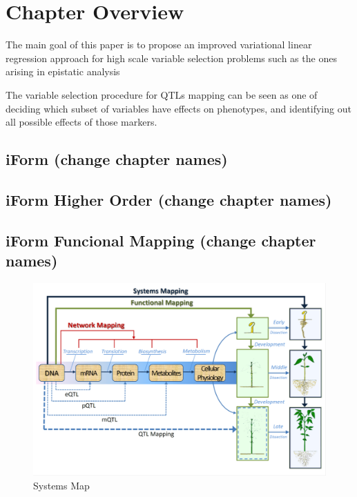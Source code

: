 \documentclass[11pt,]{book}
\theoremstyle{definition}
\theoremstyle{definition}
\theoremstyle{remark}
\begin{document}
\section{Chapter Overview}\label{chapter-overview}

The main goal of this paper is to propose an improved variational linear
regression approach for high scale variable selection problems such as
the ones arising in epistatic analysis

The variable selection procedure for QTLs mapping can be seen as one of
deciding which subset of variables have effects on phenotypes, and
identifying out all possible effects of those markers.

\subsection{iForm (change chapter
names)}\label{iform-change-chapter-names}

\subsection{iForm Higher Order (change chapter
names)}\label{iform-higher-order-change-chapter-names}

\subsection{iForm Funcional Mapping (change chapter
names)}\label{iform-funcional-mapping-change-chapter-names}

\begin{figure}

{\centering \includegraphics[width=0.8\linewidth]{images/SystemsMapping} 

}

\caption{Systems Map}\label{fig:system-map}
\end{figure}
\end{document}
